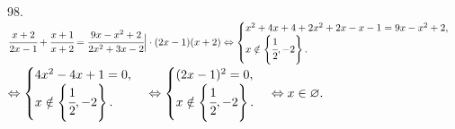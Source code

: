 98. $\cfrac{x+2}{2x-1}+\cfrac{x+1}{x+2}=\cfrac{9x-x^2+2}{2x^2+3x-2}\Big|\cdot(2x-1)(x+2)\Leftrightarrow \begin{cases}x^2+4x+4+2x^2+2x-x-1=9x-x^2+2,\\
x\notin\left\{\cfrac{1}{2},-2\right\}.\end{cases}$\\$\Leftrightarrow\begin{cases}4x^2-4x+1=0,\\
x\notin\left\{\cfrac{1}{2},-2\right\}.\end{cases}\Leftrightarrow\begin{cases}(2x-1)^2=0,\\
x\notin\left\{\cfrac{1}{2},-2\right\}.\end{cases}\Leftrightarrow x\in \varnothing.$\\
